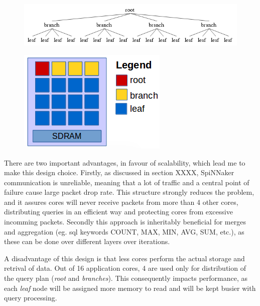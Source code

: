 \begin{figure}
\centering
\begin{minipage}{1\textwidth}
  \centering
  \includegraphics[width=0.9\linewidth, natwidth=618, natheight=120]{images/tree.png}
  \label{fig:tree}
\end{minipage}
\begin{minipage}{1\textwidth}
  \centering
  \includegraphics[width=0.5\linewidth, natwidth=270, natheight=186]{images/tree-chip.png}
  \label{fig:tree-chip}
\end{minipage}
\end{figure}

There are two important advantages, in favour of scalability, which lead me to make this design choice. Firstly, as discussed in section XXXX, SpiNNaker communication is unreliable, meaning that a lot of traffic and a central point of failure cause large packet drop rate. This structure strongly reduces the problem, and it assures cores will never receive packets from more than 4 other cores, distributing queries in an efficient way and protecting cores from excessive incomming packets. Secondly this approach is inheritably beneficial for merges and aggregation (eg. sql keywords COUNT, MAX, MIN, AVG, SUM, etc.), as these can be done over different layers over iterations. 

A disadvantage of this design is that less cores perform the actual storage and retrival of data. Out of 16 application cores, 4 are used only for distribution of the query plan (\textit{root} and \textit{branches}). This consequently impacts performance, as each \textit{leaf} node will be assigned more memory to read and will be kept busier with query processing.

